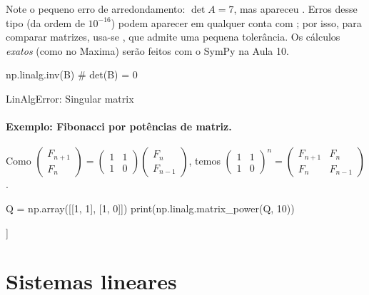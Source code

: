 Note o pequeno erro de arredondamento: $\det A=7$, mas apareceu . Erros desse tipo
(da ordem de $10^{-16}$) podem aparecer em qualquer conta com ; por isso, para comparar matrizes,
usa-se , que admite uma pequena tolerância. Os cálculos \emph{exatos} (como no Maxima) serão feitos com o SymPy na Aula 10.

\begin{entrada}
np.linalg.inv(B)            # det(B) = 0
\end{entrada}
\begin{saida}
LinAlgError: Singular matrix
\end{saida}

\paragraph{Exemplo: Fibonacci por potências de matriz.} Como
$\begin{pmatrix}F_{n+1}\\F_n\end{pmatrix}=\begin{pmatrix}1&1\\1&0\end{pmatrix}\begin{pmatrix}F_{n}\\F_{n-1}\end{pmatrix}$,
temos $\begin{pmatrix}1&1\\1&0\end{pmatrix}^n=\begin{pmatrix}F_{n+1}&F_n\\F_n&F_{n-1}\end{pmatrix}$.

\begin{entrada}
Q = np.array([[1, 1], [1, 0]])
print(np.linalg.matrix_power(Q, 10))
\end{entrada}
\begin{saida}
[[89 55]
 [55 34]]
\end{saida}

\section{Sistemas lineares}

